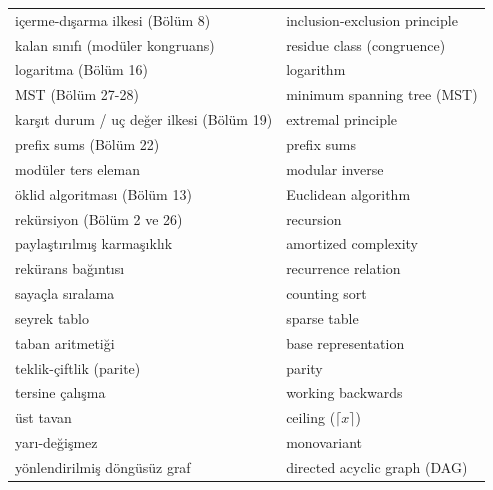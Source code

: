 \begin{center}
\begin{tabular}{p{} p{}}
içerme-dışarma ilkesi (Bölüm 8) & inclusion-exclusion principle \\
kalan sınıfı (modüler kongruans) & residue class (congruence) \\
logaritma (Bölüm 16) & logarithm \\
MST (Bölüm 27-28) & minimum spanning tree (MST) \\
karşıt durum / uç değer ilkesi (Bölüm 19) & extremal principle \\
prefix sums (Bölüm 22) & prefix sums \\
modüler ters eleman & modular inverse \\
öklid algoritması (Bölüm 13) & Euclidean algorithm \\
rekürsiyon (Bölüm 2 ve 26) & recursion \\
paylaştırılmış karmaşıklık & amortized complexity \\
rekürans bağıntısı & recurrence relation \\
sayaçla sıralama & counting sort \\
seyrek tablo & sparse table \\
taban aritmetiği & base representation \\
teklik-çiftlik (parite) & parity \\
tersine çalışma & working backwards \\
üst tavan & ceiling ($\lceil x \rceil$) \\
yarı-değişmez & monovariant \\
yönlendirilmiş döngüsüz graf & directed acyclic graph (DAG) \\
\hline
\end{tabular}
\end{center}

